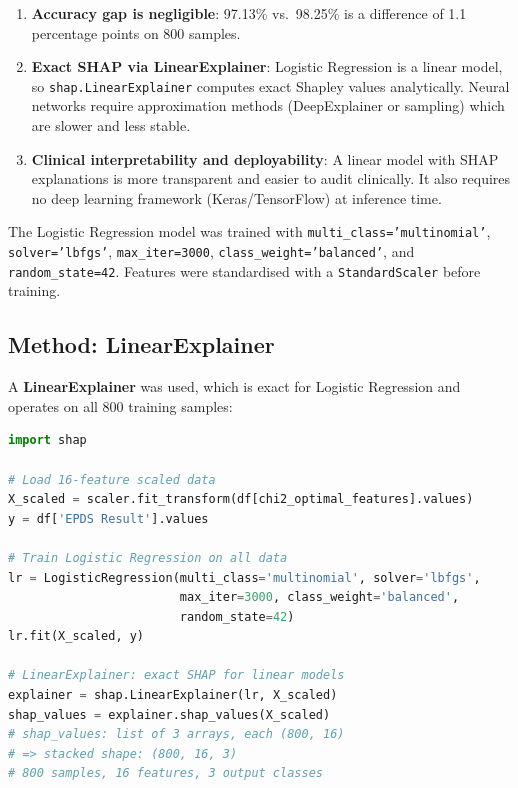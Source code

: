 \begin{enumerate}
    \item \textbf{Accuracy gap is negligible}: 97.13\% vs.\ 98.25\% is a difference of 1.1 percentage points on 800 samples.
    \item \textbf{Exact SHAP via LinearExplainer}: Logistic Regression is a linear model, so \texttt{shap.LinearExplainer} computes exact Shapley values analytically. Neural networks require approximation methods (DeepExplainer or sampling) which are slower and less stable.
    \item \textbf{Clinical interpretability and deployability}: A linear model with SHAP explanations is more transparent and easier to audit clinically. It also requires no deep learning framework (Keras/TensorFlow) at inference time.
\end{enumerate}

The Logistic Regression model was trained with \texttt{multi\_class='multinomial'}, \texttt{solver='lbfgs'}, \texttt{max\_iter=3000}, \texttt{class\_weight='balanced'}, and \texttt{random\_state=42}. Features were standardised with a \texttt{StandardScaler} before training.

\subsection{Method: LinearExplainer}

A \textbf{LinearExplainer} was used, which is exact for Logistic Regression and operates on all 800 training samples:

\begin{lstlisting}[language=Python, caption={SHAP analysis with LinearExplainer on Logistic Regression.}]
import shap

# Load 16-feature scaled data
X_scaled = scaler.fit_transform(df[chi2_optimal_features].values)
y = df['EPDS Result'].values

# Train Logistic Regression on all data
lr = LogisticRegression(multi_class='multinomial', solver='lbfgs',
                        max_iter=3000, class_weight='balanced',
                        random_state=42)
lr.fit(X_scaled, y)

# LinearExplainer: exact SHAP for linear models
explainer = shap.LinearExplainer(lr, X_scaled)
shap_values = explainer.shap_values(X_scaled)
# shap_values: list of 3 arrays, each (800, 16)
# => stacked shape: (800, 16, 3)
# 800 samples, 16 features, 3 output classes
\end{lstlisting}

